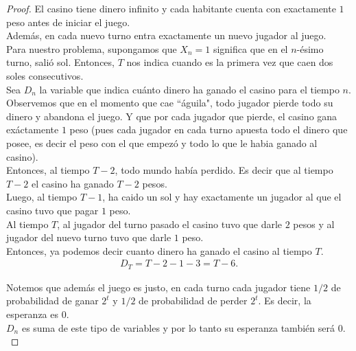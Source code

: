 \begin{proof}
		   	\;El casino tiene dinero infinito y cada habitante cuenta con exactamente $1$ peso antes de
		   	iniciar el juego.\\
		   
		   	Además, en cada nuevo turno entra exactamente un nuevo jugador al juego.\\
		   
		   	Para nuestro problema, supongamos que $X_n = 1$ significa que en el $n$-ésimo turno, salió sol.
		   	Entonces, $T$ nos indica cuando es la primera vez que caen dos soles consecutivos.\\
		   
		   	Sea $D_n$ la variable que indica cuánto dinero ha ganado el casino para el tiempo $n$.\\
		   
		   	Observemos que en el momento que cae ``águila", todo jugador pierde todo su dinero y abandona el juego.
		   	Y que por cada jugador que pierde, el casino gana exáctamente $1$ peso (pues cada jugador en cada
		   	turno apuesta todo el dinero que posee, es decir el peso con el que empezó y todo lo que le habia
		   	ganado al casino).\\
		   
		   	Entonces, al tiempo $T-2$, todo mundo había perdido. Es decir que al tiempo $T-2$ el casino ha ganado
		   	$T-2$ pesos.\\
		   
		   	Luego, al tiempo $T-1$, ha caido un sol y hay exactamente un jugador al que el casino tuvo 
		   	que pagar $1$ peso.\\
		   
		   	Al tiempo $T$, al jugador del turno pasado el casino tuvo que darle $2$ pesos y al jugador del nuevo
		   	turno tuvo que darle $1$ peso.\\
		   
		   	Entonces, ya podemos decir cuanto dinero ha ganado el casino al tiempo $T$.
			\begin{align}\label{problema1_3:Dinero_al_tiempo_T}
				D_T = T-2 - 1 - 3 = T - 6. 
			\end{align}					   
		   
		   	Notemos que además el juego es justo, en cada turno cada jugador tiene $1/2$ de probabilidad de
		   	ganar $2^t$ y $1/2$ de probabilidad de perder $2^t$. Es decir, la esperanza es $0$.\\
		   	
		   	$D_n$ es suma de este tipo de variables y por lo tanto su esperanza también será $0$.\\
		   

\end{proof}
